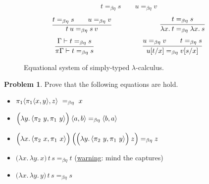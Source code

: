 \documentclass[a4paper, 11pt]{article}
\theoremstyle{definition}
\newtheorem{problem}{Problem}
\begin{document}
\begin{figure}[h]
\begin{minipage}{1\textwidth}
\begin{align*}
{                          t =_{\beta \eta} s
                          \qquad
                          u =_{\beta \eta} v
                  }
        \end{align*}
        \begin{align*}
                \infer{ t \> u =_{\beta \eta} s \> v }{
                          t =_{\beta \eta} s
                          \qquad
                          u =_{\beta \eta} v
                  }
                \hspace{2.5cm}
                \infer {\lambda x. \> t =_{\beta \eta} \lambda x. \> s}{
                        t =_{\beta \eta} s
                }
        \end{align*}
        \begin{align*}
                \infer{
                        \pi \Gamma \vljud t =_{\beta \eta}  s
                }{
                        \Gamma \vljud t =_{\beta \eta} s
                }
                \hspace{2.5cm}
                \infer{
                        u[t/x] =_{\beta \eta} v[s/x]
                }{
                        u =_{\beta \eta} v \qquad t =_{\beta \eta} s
                }
        \end{align*}
\end{minipage}
\caption{Equational system of simply-typed $\lambda$-calculus.}
\label{fig:eq_lambda_calc2}
\end{figure}


\begin{problem}
        Prove that the following equations are hold.
        \begin{itemize}
                \item $\pi_1 \pv{\pi_1 \pv{x}{y}}{z}\ =_{\beta \eta}\ x$ 
                \item $\Big ( \lambda y.\, \pv{\pi_2\ y}{\pi_1\ y} \Big )\>  \pv{a}{b} 
                        =_{\beta \eta} \pv{b}{a}$
                \item $\Big ( \lambda x.\, \pv{\pi_2\ x}{\pi_1\ x} \Big )\> 
                      \Big ( \Big ( \lambda y.\, \pv{\pi_2\ y}{\pi_1\ y} \Big ) \> z \Big ) 
                        =_{\beta \eta} z$
                \item $\Big ( \lambda x. \, \lambda y. \, x \Big ) \, t \, s =_{\beta \eta} t$
                        {\small (\underline{warning}: mind the captures) }
                \item $\Big ( \lambda x. \, \lambda y. \, y \Big ) \, t \, s =_{\beta \eta} s$
        \end{itemize}
\end{problem}
\end{document}
